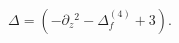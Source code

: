 \begin{equation}
\Delta=\left (-\partial_ z{}^2-\Delta^{(4)}_f+3\right).
\label{eigferm}
\end{equation}

